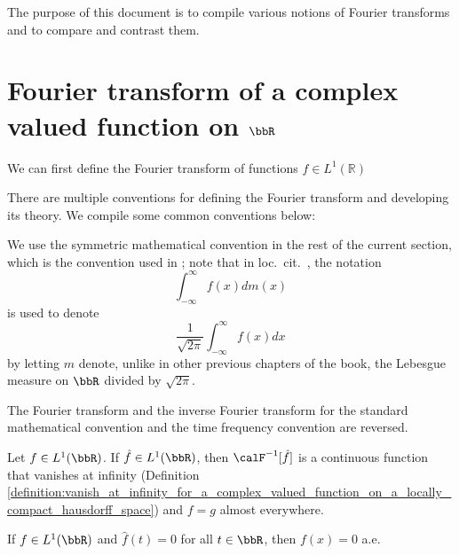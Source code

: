 
The purpose of this document is to compile various notions of Fourier transforms and to compare and contrast them.

\section{Fourier transform of a complex valued function on \texorpdfstring{$\bbR$}{R}} \label{section:fourier_transforms_for_complex_valued_functions_on_R}

We can first define the Fourier transform of functions $f \in L^1(\mathbb{R})$



There are multiple conventions for defining the Fourier transform and developing its theory. We compile some common conventions below: 



\begin{convention}
    We use the symmetric mathematical convention in the rest of the current section, which is the convention used in \cite[Chapter 9]{rudin_real_and_complex}; note that in loc.~cit.~, the notation 
    $$\int_{-\infty}^{\infty} f(x) dm(x)$$
    is used to denote
    $$\frac{1}{\sqrt{2\pi}} \int_{-\infty}^{\infty} f(x) dx$$
    by letting $m$ denote, unlike in other previous chapters of the book, the Lebesgue measure on $\bbR$ divided by $\sqrt{2\pi}$.
\end{convention}

\begin{remark}
    The Fourier transform and the inverse Fourier transform for the standard mathematical convention and the time frequency convention are reversed.
\end{remark}

\begin{theorem}
    Let $f \in L^1(\bbR)$. If $\hat{f} \in L^1(\bbR)$, then $\calF^{-1}[\hat{f}]$ is a continuous function that vanishes at infinity (Definition \ref{definition:vanish_at_infinity_for_a_complex_valued_function_on_a_locally_compact_hausdorff_space}) and $f = g$ almost everywhere.
\end{theorem}

\begin{theorem}
    If $f \in L^{1}(\bbR)$ and $\hat{f}(t)=0$ for all $t \in \bbR$, then $f(x)=0$ a.e.
\end{theorem}


